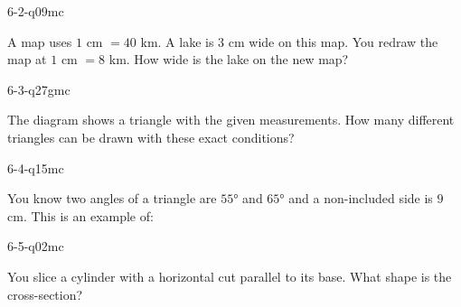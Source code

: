 \begin{practiceQuestion}{6-2-q09}{mc}
\begin{questionText}
A map uses $1$ cm $= 40$ km. A lake is $3$ cm wide on this map. You redraw the map at $1$ cm $= 8$ km. How wide is the lake on the new map?
\end{questionText}
\end{practiceQuestion}

\begin{practiceQuestion}{6-3-q27}{gmc}
\begin{questionText}
The diagram shows a triangle with the given measurements. How many different triangles can be drawn with these exact conditions?

\begin{center}
\end{center}
\end{questionText}
\end{practiceQuestion}

\begin{practiceQuestion}{6-4-q15}{mc}
\begin{questionText}
You know two angles of a triangle are $55°$ and $65°$ and a non-included side is $9$ cm. This is an example of:
\end{questionText}
\end{practiceQuestion}

\begin{practiceQuestion}{6-5-q02}{mc}
\begin{questionText}
You slice a cylinder with a horizontal cut parallel to its base. What shape is the cross-section?
\end{questionText}
\end{practiceQuestion}

